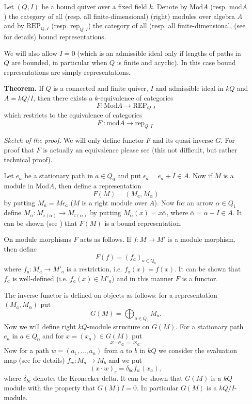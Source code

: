 \documentclass[12pt]{article}
\begin{document}
Let $(Q,I)$ be a bound quiver over a fixed field $k$. Denote by $\mathrm{Mod}A$ (resp. $\mathrm{mod}A$) the category of all (resp. all finite-dimensional) (right) modules over algebra $A$ and by $\mathrm{REP}_{Q,I}$ (resp. $\mathrm{rep}_{Q,I}$) the category of all (resp. all finite-dimensional, (see  for details) bound representations. 

We will also allow $I=0$ (which is an admissible ideal only if lengths of paths in $Q$ are bounded, in particular when $Q$ is finite and acyclic). In this case bound representations are simply representations.

\textbf{Theorem.} If $Q$ is a connected and finite quiver, $I$ and admissible ideal in $kQ$ and $A=kQ/I$, then there exists a $k$-equivalence of categories
$$F:\mathrm{Mod}A\to\mathrm{REP}_{Q,I}$$
which restricts to the equivalence of categories
$$F':\mathrm{mod}A\to\mathrm{rep}_{Q,I}.$$

\textit{Sketch of the proof.} We will only define functor $F$ and its quasi-inverse $G$. For proof that $F$ is actually an equivalence please see \cite[Theorem 1.6]{ASS} (this not difficult, but rather technical proof).

Let $e_a$ be a stationary path in $a\in Q_0$ and put $\epsilon_a=e_a+I\in A$. Now if $M$ is a module in $\mathrm{Mod}A$, then define a representation
$$F(M)=(M_{a}, M_{\alpha})$$
by putting $M_a=M\epsilon_a$ ($M$ is a right module over $A$). Now for an arrow $\alpha\in Q_1$ define $M_{\alpha}:M_{s(\alpha)}\to M_{t(\alpha)}$ by putting $M_{\alpha}(x)=x\overline{\alpha}$, where $\overline{\alpha}=\alpha+I\in A$. It can be shown (see \cite{ASS}) that $F(M)$ is a bound representation.

On module morphisms $F$ acts as follows. If $f:M\to M'$ is a module morphism, then define
$$F(f)=(f_a)_{a\in Q_0}$$
where $f_a:M_a\to M'_a$ is a restriction, i.e. $f_a(x)=f(x)$. It can be shown that $f_a$ is well-defined (i.e. $f_a(x)\in M'_a$) and in this manner $F$ is a functor.

The inverse functor is defined on objects as follows: for a representation $(M_a,M_{\alpha})$ put
$$G(M)=\bigoplus_{a\in Q_0} M_a.$$
Now we will define right $kQ$-module structure on $G(M)$. For a stationary path $e_a$ in $a\in Q_0$ and for $x=(x_a)\in G(M)$ put
$$x\cdot e_a=x_a.$$
Now for a path $w=(a_1,\ldots,a_n)$ from $a$ to $b$ in $kQ$ we consider the evaluation map (see  for details) $f_w:M_a\to M_b$ and we put
$$(x\cdot w)_c=\delta_{bc}f_w(x_a),$$
where $\delta_{bc}$ denotes the Kronecker delta. It can be shown that $G(M)$ is a $kQ$-module with the property that $G(M)I=0$. In particular $G(M)$ is a $kQ/I$-module.
\end{document}
